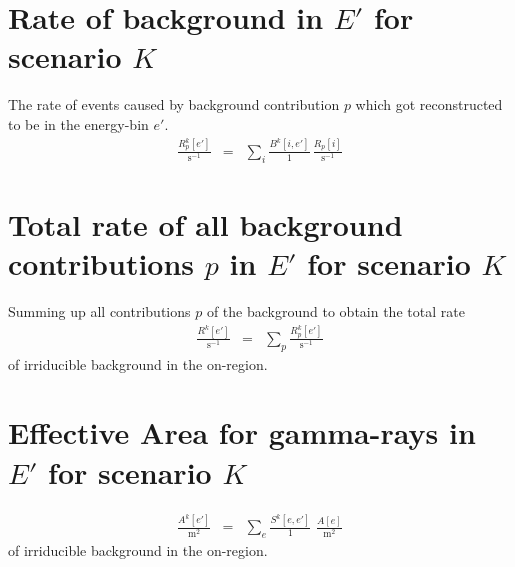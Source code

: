 \documentclass{article}%
\begin{document}
\section{Rate of background in $E'$ for scenario $K$}
%
The rate of events caused by background contribution $p$ which got reconstructed to be in the energy-bin $e'$.
%
\begin{eqnarray}
\frac{R^k_p[e']}{\text{s}^{-1}}
&=&
\sum_{i}
\frac{B^k[i, e']}{1} \,
\frac{R_p[i]}{\text{s}^{-1}}
\end{eqnarray}
%
\section{Total rate of all background contributions $p$ in $E'$ for scenario $K$}
%
Summing up all contributions $p$ of the background to obtain the total rate
%
\begin{eqnarray}
\frac{R^k[e']}{\text{s}^{-1}}
&=&
\sum_{p}
\frac{R^k_p[e']}{\text{s}^{-1}}
\end{eqnarray}
%
of irriducible background in the on-region.
%
\section{Effective Area for gamma-rays in $E'$ for scenario $K$}
%
\begin{eqnarray}
\frac{A^k[e']}{\text{m}^2}
&=&
\sum_{e}
\frac{S^k[e, e']}{1} \,\,
\frac{A[e]}{\text{m}^2}
\end{eqnarray}
%
of irriducible background in the on-region.
%
%
%
%
\end{document}
